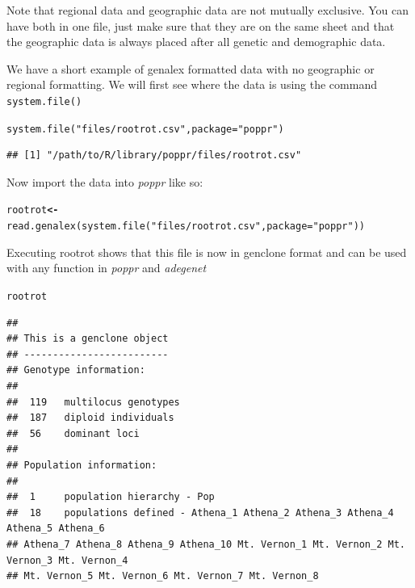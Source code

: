 \documentclass[letterpaper]{article}\usepackage[]{graphicx}\usepackage[]{color}
\makeatletter
\newcommand{\hlstr}[1]{\textcolor[rgb]{0.651,0.522,0}{#1}}%
\newcommand{\hlstd}[1]{\textcolor[rgb]{0,0,0}{#1}}%
\newcommand{\hlkwb}[1]{\textcolor[rgb]{0.502,0.502,0.753}{\textbf{#1}}}%
\newcommand{\hlkwc}[1]{\textcolor[rgb]{0,0.502,0.753}{#1}}%
\newcommand{\hlkwd}[1]{\textcolor[rgb]{0,0.267,0.4}{#1}}%
\newenvironment{kframe}{%
 \def\at@end@of@kframe{}%
 \ifinner\ifhmode%
  \def\at@end@of@kframe{\end{minipage}}%
  \begin{minipage}{\columnwidth}%
 \fi\fi%
 \def\FrameCommand##1{\hskip\@totalleftmargin \hskip-\fboxsep
 \colorbox{shadecolor}{##1}\hskip-\fboxsep
     \hskip-\linewidth \hskip-\@totalleftmargin \hskip\columnwidth}%
 \MakeFramed {\advance\hsize-\width
   \@totalleftmargin\z@ \linewidth\hsize
   \@setminipage}}%
 {\par\unskip\endMakeFramed%
 \at@end@of@kframe}
\newenvironment{knitrout}{}{} %
\makeatother
\begin{document}
Note that regional data and geographic data are not mutually exclusive. You can have both in one file, just make sure that they are on the same sheet and that the geographic data is always placed after all genetic and demographic data.

We have a short example of genalex formatted data with no geographic or regional formatting. We will first see where the data is using the command \texttt{system.file()}
\begin{knitrout}\footnotesize
{}\color{fgcolor}\begin{kframe}
\begin{alltt}
\hlkwd{system.file}\hlstd{(}\hlstr{"files/rootrot.csv"}\hlstd{,} \hlkwc{package} \hlstd{=} \hlstr{"poppr"}\hlstd{)}
\end{alltt}
\end{kframe}
\end{knitrout}

\begin{knitrout}\footnotesize
{}\color{fgcolor}\begin{kframe}
\begin{verbatim}
## [1] "/path/to/R/library/poppr/files/rootrot.csv"
\end{verbatim}
\end{kframe}
\end{knitrout}

Now import the data into \textit{poppr} like so:
\begin{knitrout}\footnotesize
{}\color{fgcolor}\begin{kframe}
\begin{alltt}
\hlstd{rootrot} \hlkwb{<-} \hlkwd{read.genalex}\hlstd{(}\hlkwd{system.file}\hlstd{(}\hlstr{"files/rootrot.csv"}\hlstd{,} \hlkwc{package} \hlstd{=} \hlstr{"poppr"}\hlstd{))}
\end{alltt}
\end{kframe}
\end{knitrout}

Executing rootrot shows that this file is now in genclone format and can be used
with any function in \textit{poppr} and \textit{adegenet}
\begin{knitrout}\footnotesize
{}\color{fgcolor}\begin{kframe}
\begin{alltt}
\hlstd{rootrot}
\end{alltt}
\begin{verbatim}
## 
## This is a genclone object
## -------------------------
## Genotype information:
## 
##  119   multilocus genotypes
##  187   diploid individuals
##  56    dominant loci
## 
## Population information:
## 
##  1     population hierarchy - Pop
##  18    populations defined - Athena_1 Athena_2 Athena_3 Athena_4 Athena_5 Athena_6 
## Athena_7 Athena_8 Athena_9 Athena_10 Mt. Vernon_1 Mt. Vernon_2 Mt. Vernon_3 Mt. Vernon_4 
## Mt. Vernon_5 Mt. Vernon_6 Mt. Vernon_7 Mt. Vernon_8
\end{verbatim}
\end{kframe}
\end{knitrout}
\end{document}
